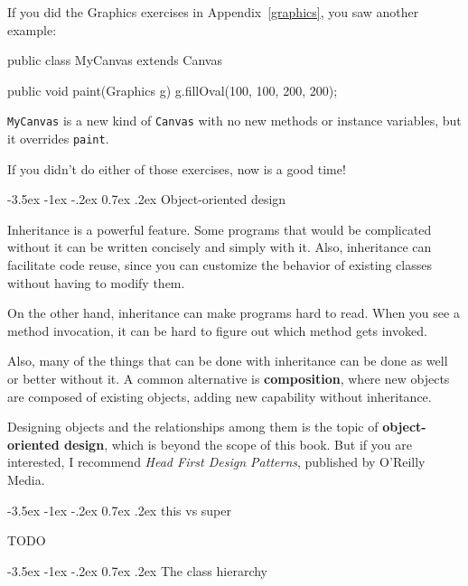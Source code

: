 \documentclass[12pt]{book}
\makeatletter
\renewcommand{\section}{\@startsection {section}{1}{\z@}%
    {-3.5ex \@plus -1ex \@minus -.2ex}%
    {0.7ex \@plus.2ex}%
    {\normalfont\Large\bfseries}}
\theoremstyle{exercise}
\newcommand{\java}[1]{\lstinline{#1}} %
\makeatother
\begin{document}
If you did the Graphics exercises in Appendix~\ref{graphics}, you saw another example:

\begin{code}
public class MyCanvas extends Canvas {

    public void paint(Graphics g) {
        g.fillOval(100, 100, 200, 200);
    }
}
\end{code}

\java{MyCanvas} is a new kind of \java{Canvas} with no new methods or instance variables, but it overrides \java{paint}.

If you didn't do either of those exercises, now is a good time!


\section{Object-oriented design}

Inheritance is a powerful feature.
Some programs that would be complicated without it can be written concisely and simply with it.
Also, inheritance can facilitate code reuse, since you can customize the behavior of existing classes without having to modify them.

On the other hand, inheritance can make programs hard to read.
When you see a method invocation, it can be hard to figure out which method gets invoked.

Also, many of the things that can be done with inheritance can be done as well or better without it.
A common alternative is {\bf composition}, where new objects are composed of existing objects, adding new capability without inheritance.

Designing objects and the relationships among them is the topic of {\bf object-oriented design}, which is beyond the scope of this book.
But if you are interested, I recommend {\em Head First Design Patterns}, published by O'Reilly Media.


\section{this vs super}

TODO


\section{The class hierarchy}
\end{document}
